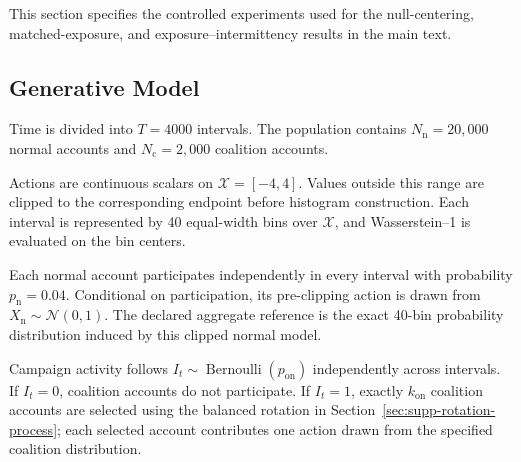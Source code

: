 This section specifies the controlled experiments used for the null-centering,
matched-exposure, and exposure--intermittency results in the main text.


\subsection{Generative Model}
\label{sec:supp-rotation-model}

Time is divided into $T=4000$ intervals. The population contains
$N_{\mathrm n}=20{,}000$ normal accounts and
$N_{\mathrm c}=2{,}000$ coalition accounts.

Actions are continuous scalars on $\mathcal X=[-4,4]$. Values outside this
range are clipped to the corresponding endpoint before histogram
construction. Each interval is represented by 40 equal-width bins over
$\mathcal X$, and Wasserstein--1 is evaluated on the bin centers.

Each normal account participates independently in every interval with
probability $p_{\mathrm n}=0.04$. Conditional on participation, its
pre-clipping action is drawn from $X_{\mathrm n}\sim\mathcal N(0,1)$.
The declared aggregate reference is the exact 40-bin probability
distribution induced by this clipped normal model.

Campaign activity follows
$I_t\sim\operatorname{Bernoulli}(p_{\mathrm{on}})$ independently across
intervals. If $I_t=0$, coalition accounts do not participate. If $I_t=1$,
exactly $k_{\mathrm{on}}$ coalition accounts are selected using the balanced
rotation in Section~\ref{sec:supp-rotation-process}; each selected account
contributes one action drawn from the specified coalition distribution.


